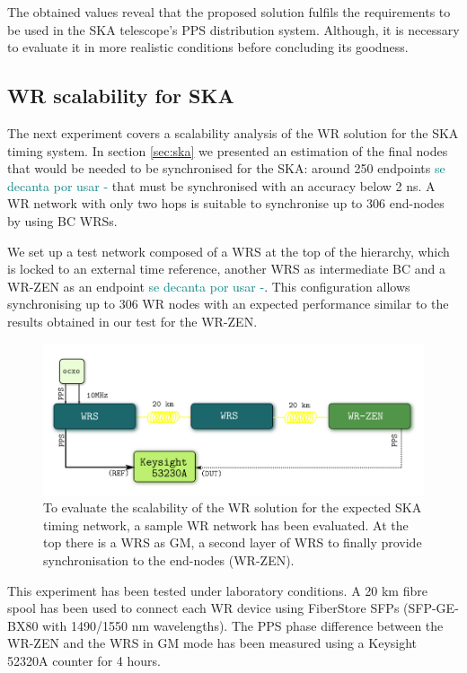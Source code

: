 The obtained values reveal that the proposed solution fulfils the requirements 
to be used in the SKA telescope's PPS distribution system. Although, it is 
necessary to evaluate it in more realistic conditions before concluding its 
goodness.

\subsection{WR scalability for SKA}
\label{subsec: net_exp}

The next experiment covers a scalability analysis of the WR solution for the 
SKA timing system. In section \ref{sec:ska} we presented an estimation of the final nodes that would be needed to be synchronised for the SKA: around 250 endpoints \textcolor{teal}{se decanta por usar -} that must be synchronised with an accuracy below 2 ns. A WR network with only two hops is suitable to synchronise up to 306 end-nodes by using BC WRSs.

We set up a test network composed of a WRS at the top of the hierarchy, which is locked to an external time reference, another WRS as intermediate BC and a WR-ZEN as an endpoint \textcolor{teal}{se decanta por usar -}. This configuration allows synchronising up to 306 WR nodes with an expected performance similar to the results obtained in our test for the WR-ZEN.

\begin{figure}
	\centering
	\includegraphics[width=0.7\linewidth]{img/prueba_red}
	\caption[WR Scalability test's setup for SKA]{To evaluate the scalability 
	of the WR solution for the expected SKA timing network, a sample WR 
	network has been evaluated. At the top there is a WRS as GM, a second layer 
	of WRS to finally provide synchronisation to the end-nodes (WR-ZEN).}
	\label{fig:pruebared}
\end{figure}

This experiment has been tested under laboratory conditions. A 20 km fibre spool has 
been used to connect each WR device using FiberStore SFPs (SFP-GE-BX80 with 1490/1550 nm wavelengths). 
The PPS phase difference between the WR-ZEN and the WRS in GM mode has been measured  using a Keysight 52320A 
counter for 4 hours.

